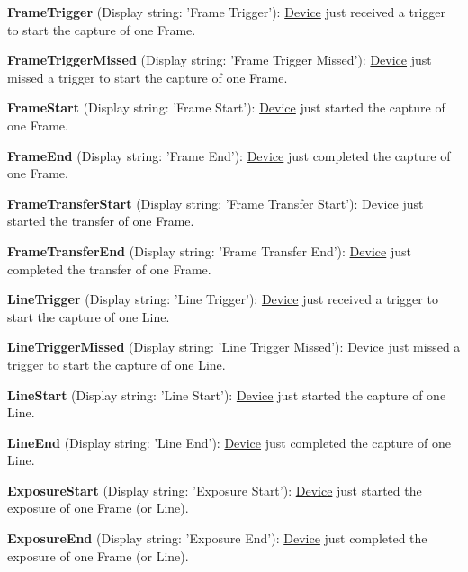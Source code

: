 \begin{DoxyItemize}
\item {\bfseries Frame\+Trigger} (Display string\+: 'Frame Trigger')\+: \hyperlink{classmv_i_m_p_a_c_t_1_1acquire_1_1_device}{Device} just received a trigger to start the capture of one Frame.
\item {\bfseries Frame\+Trigger\+Missed} (Display string\+: 'Frame Trigger Missed')\+: \hyperlink{classmv_i_m_p_a_c_t_1_1acquire_1_1_device}{Device} just missed a trigger to start the capture of one Frame.
\item {\bfseries Frame\+Start} (Display string\+: 'Frame Start')\+: \hyperlink{classmv_i_m_p_a_c_t_1_1acquire_1_1_device}{Device} just started the capture of one Frame.
\item {\bfseries Frame\+End} (Display string\+: 'Frame End')\+: \hyperlink{classmv_i_m_p_a_c_t_1_1acquire_1_1_device}{Device} just completed the capture of one Frame.
\item {\bfseries Frame\+Transfer\+Start} (Display string\+: 'Frame Transfer Start')\+: \hyperlink{classmv_i_m_p_a_c_t_1_1acquire_1_1_device}{Device} just started the transfer of one Frame.
\item {\bfseries Frame\+Transfer\+End} (Display string\+: 'Frame Transfer End')\+: \hyperlink{classmv_i_m_p_a_c_t_1_1acquire_1_1_device}{Device} just completed the transfer of one Frame.
\item {\bfseries Line\+Trigger} (Display string\+: 'Line Trigger')\+: \hyperlink{classmv_i_m_p_a_c_t_1_1acquire_1_1_device}{Device} just received a trigger to start the capture of one Line.
\item {\bfseries Line\+Trigger\+Missed} (Display string\+: 'Line Trigger Missed')\+: \hyperlink{classmv_i_m_p_a_c_t_1_1acquire_1_1_device}{Device} just missed a trigger to start the capture of one Line.
\item {\bfseries Line\+Start} (Display string\+: 'Line Start')\+: \hyperlink{classmv_i_m_p_a_c_t_1_1acquire_1_1_device}{Device} just started the capture of one Line.
\item {\bfseries Line\+End} (Display string\+: 'Line End')\+: \hyperlink{classmv_i_m_p_a_c_t_1_1acquire_1_1_device}{Device} just completed the capture of one Line.
\item {\bfseries Exposure\+Start} (Display string\+: 'Exposure Start')\+: \hyperlink{classmv_i_m_p_a_c_t_1_1acquire_1_1_device}{Device} just started the exposure of one Frame (or Line).
\item {\bfseries Exposure\+End} (Display string\+: 'Exposure End')\+: \hyperlink{classmv_i_m_p_a_c_t_1_1acquire_1_1_device}{Device} just completed the exposure of one Frame (or Line).

\end{DoxyItemize}
